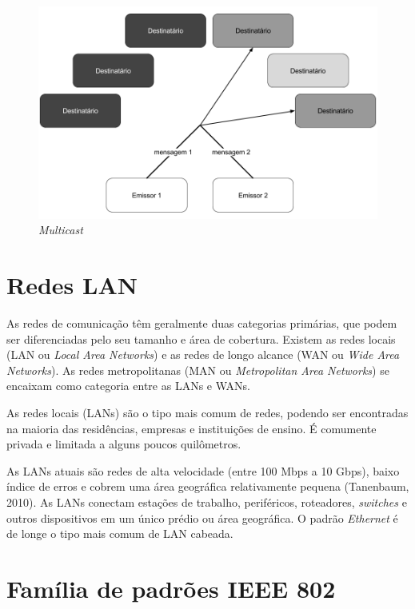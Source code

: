 \documentclass[
12pt,				%
openright,			%
oneside,			%
a4paper,			%
brazil,				%
]{abntex2}
\begin{document}
	\begin{figure} [H]
		\centering
		\includegraphics[scale=.45]{figuras/cap2/07Multicast}
		\caption{\label{fig_7}\textit{Multicast}}
	\end{figure}	

	\section{Redes LAN}
	
	\par As redes de comunicação têm geralmente duas categorias primárias, que podem ser diferenciadas pelo seu tamanho e área de cobertura. Existem as redes locais (LAN ou \textit{Local Area Networks}) e as redes de longo alcance (WAN ou \textit{Wide Area Networks}). As redes metropolitanas (MAN ou \textit{Metropolitan Area Networks}) se encaixam como categoria entre as LANs e WANs.
	
	\par As redes locais (LANs) são o tipo mais comum de redes, podendo ser encontradas na maioria das residências, empresas e instituições de ensino. É comumente privada e limitada a alguns poucos quilômetros.
	
	\par As LANs atuais são redes de alta velocidade (entre 100 Mbps a 10 Gbps), baixo índice de erros e cobrem uma área geográfica relativamente pequena (Tanenbaum, 2010). As LANs conectam estações de trabalho, periféricos, roteadores, \textit{switches} e outros dispositivos em um único prédio ou área geográfica. O padrão \textit{Ethernet} é de longe o tipo mais comum de LAN cabeada.
	
	\section{Família de padrões IEEE 802}
	
\end{document}
